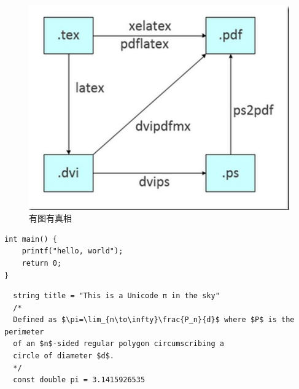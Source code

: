 \documentclass[UTF8]{ctexart} %
\begin{document}
\begin{figure}[htbp] %
\centering %
\includegraphics[width = .8\textwidth]{a.jpg} %
\caption{有图有真相} %
\label{fig:myphoto}
\end{figure}

\begin{verbatim}
int main() {
    printf("hello, world");
    return 0;
}
\end{verbatim}

\begin{verbatim}
  string title = "This is a Unicode π in the sky"
  /*
  Defined as $\pi=\lim_{n\to\infty}\frac{P_n}{d}$ where $P$ is the perimeter
  of an $n$-sided regular polygon circumscribing a
  circle of diameter $d$.
  */
  const double pi = 3.1415926535
\end{verbatim}
\end{document}
